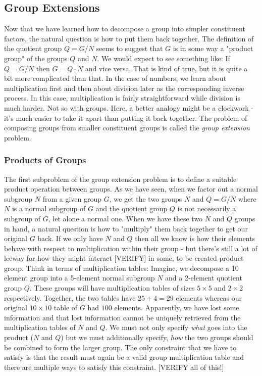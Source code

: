 \subsection{Group Extensions}
Now that we have learned how to decompose a group into simpler constituent factors, the natural question is how to put them back together. The definition of the quotient group $Q = G / N$ seems to suggest that $G$ is in some way a "product group" of the groups $Q$ and $N$. We would expect to see something like: If $Q = G / N$ then $G = Q \cdot N$ and vice versa. That is kind of true, but it is quite a bit more complicated than that. In the case of numbers, we learn about multiplication first and then about division later as the corresponding inverse process. In this case, multiplication is fairly straightforward while division is much harder. Not so with groups. Here, a better analogy might be a clockwork - it's much easier to take it apart than putting it back together. The problem of composing groups from smaller constituent groups is called the \emph{group extension} problem. 


\subsubsection{Products of Groups}
The first subproblem of the group extension problem is to define a suitable product operation between groups. As we have seen, when we factor out a normal subgroup $N$ from a given group $G$, we get the two groups $N$ and $Q = G / N$ where $N$ is a normal subgroup of $G$ and the quotient group $Q$ is not necessarily a subgroup of $G$, let alone a normal one. When we have these two $N$ and $Q$ groups in hand, a natural question is how to "multiply" them back together to get our original $G$ back. If we only have $N$ and $Q$ then all we know is how their elements behave with respect to multiplication within their group - but there's still a lot of leeway for how they might interact [VERIFY] in some, to be created product group. Think in terms of multiplication tables: Imagine, we decompose a 10 element group into a 5-element normal subgroup $N$ and a 2-element quotient group $Q$. These groups will have multiplication tables of sizes $5 \times 5$ and $2 \times 2$ respectively. Together, the two tables have $25 + 4 = 29$ elements whereas our original $10 \times 10$ table of $G$ had $100$ elements. Apparently, we have lost some information and that lost information cannot be uniquely retrieved from the multiplication tables of $N$ and $Q$. We must not only specify \emph{what} goes into the product ($N$ and $Q$) but we must additionally specify, \emph{how} the two groups should be combined to form the larger group. The only constraint that we have to satisfy is that the result must again be a valid group multiplication table and there are multiple ways to satisfy this constraint. 
[VERIFY all of this!]


